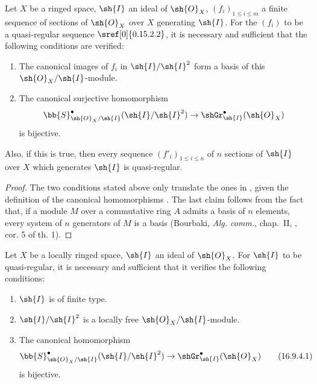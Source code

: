 \begin{proposition}[16.9.3]
\label{IV.16.9.3}
Let $X$ be a ringed space, $\sh{I}$ an ideal of $\sh{O}_X$, $(f_i)_{1 \leq i \leq m}$ a finite sequence of sections of $\sh{O}_X$ over $X$ generating $\sh{I}$.
For the $(f_i)$ to be a quasi-regular sequence $\sref[0]{0.15.2.2}$, it is necessary and sufficient that the following conditions are verified:
\begin{enumerate}
  \item[\rm{(i)}] The canonical images of $f_i$ in $\sh{I}/\sh{I}^2$ form a basis of this $\sh{O}_X/\sh{I}$-module.
  \item[\rm{(ii)}] The canonical surjective homomorphism 
  \[
    \bb{S}_{\sh{O}_X/\sh{I}}^\bullet (\sh{I}/\sh{I}^2) \to \shGr_{\sh{I}}^\bullet(\sh{O}_X) 
  \]
  is bijective.
\end{enumerate}

Also, if this is true, then every sequence $(f'_i)_{1 \leq i \leq n}$ of $n$ sections of $\sh{I}$ over $X$ which generates $\sh{I}$ is quasi-regular.
\end{proposition}


\begin{proof}
The two conditions stated above only translate the ones in , given the definition of the canonical homomorphisms .
The last claim follows from the fact that, if a module $M$ over a commutative ring $A$ admits a basis of $n$ elements, every system of $n$ generators of $M$ is a basis (Bourbaki, \emph{Alg. comm.}, chap.~II, , cor. 5 of th. 1).
\end{proof}

\begin{corollary}[16.9.4]
\label{IV.16.9.4}
Let $X$ be a locally ringed space, $\sh{I}$ an ideal of $\sh{O}_X$.
For $\sh{I}$ to be quasi-regular, it is necessary and sufficient that it verifies the following conditions:
\begin{enumerate}
  \item[\rm{(i)}] $\sh{I}$ is of finite type.
  \item[\rm{(ii)}] $\sh{I}/\sh{I}^2$ is a locally free $\sh{O}_X/\sh{I}$-module.
  \item[\rm{(iii)}] The canonical homomorphism
  \[
    \label{IV.16.9.4.1}
    \bb{S}_{\sh{O}_X/\sh{I}}^\bullet (\sh{I}/\sh{I}^2) \to \shGr_{\sh{I}}^\bullet(\sh{O}_X) 
    \tag{16.9.4.1}
  \]
  is bijective.
\end{enumerate}
\end{corollary}

